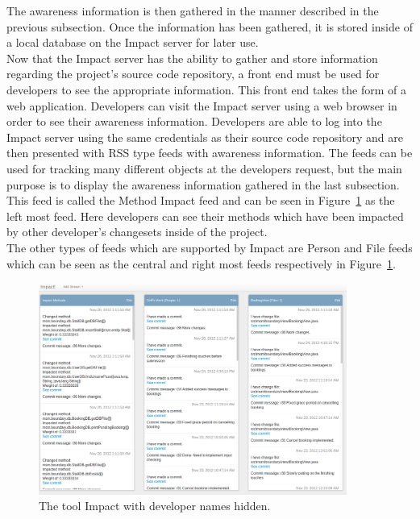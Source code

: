 \documentclass[conference]{IEEEtran}
\begin{document}
The awareness information is then gathered in the manner described in the previous subsection. Once the 
information has been gathered, it is stored inside of a local database on the Impact server for later use.\\

Now that the Impact server has the ability to gather and store information regarding the project's source code
repository, a front end must be used for developers to see the appropriate information. This front end
takes the form of a web application. Developers can visit the Impact server using a web browser in order to
see their awareness information. Developers are able to log into the Impact server using the same credentials 
as their source code repository and are then presented with RSS type feeds with awareness information.
The feeds can be used for tracking many different objects at the developers request, but the main purpose
is to display the awareness information gathered in the last subsection. This feed is called the Method Impact
feed and can be seen in Figure~\ref{fig:impact} as the left most feed. Here developers can see their methods
which have been impacted by other developer's changesets inside of the project. \\

The other types of feeds which are supported by Impact are Person and File feeds which can be seen as
the central and right most feeds respectively in Figure~\ref{fig:impact}.\\

\begin{figure}[tb!]
\centering
\includegraphics[width=0.9\textwidth]{images/ImpactDemo}
\caption{The tool Impact with developer names hidden.\label{fig:impact}}
\end{figure}
\end{document}
